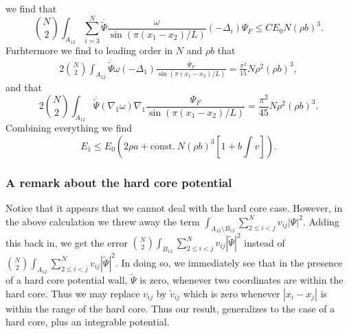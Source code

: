 \documentclass[a4paper,11pt]{article}
\newcommand{\abs}[1]{\left\lvert #1 \right\rvert}
\numberwithin{equation}{section}
\begin{document}
	we find that \begin{equation}
	\binom{N}{2}\int_{A_{12}}\sum_{i=3}^{N} \overline{\tilde{\Psi}}\frac{\omega}{\sin(\pi(x_1-x_2)/L)}(-\Delta_i)\Psi_F\leq C E_0 N(\rho b)^3.
	\end{equation}
	Furhtermore we find to leading order in $ N $ and $ \rho b $ that \begin{equation}
	\begin{aligned}
	2\binom{N}{2}\int_{A_{12}}\overline{\tilde{\Psi}}\omega(-\Delta_1)\frac{\Psi_F}{\sin(\pi(x_1-x_2)/L)}=\frac{\pi^2}{15}N\rho^2 (\rho b)^3,
	\end{aligned}
	\end{equation}
	and that \begin{equation}
	2\binom{N}{2}\int_{A_{12}}\overline{\tilde{\Psi}}(\nabla_1\omega)\nabla_1\frac{\Psi_F}{\sin(\pi(x_1-x_2)/L)}=\frac{\pi^2}{45}N\rho^2(\rho b)^3.
	\end{equation}
	Combining everything we find \begin{equation}
	E_1\leq E_0 \left(2\rho a+ \text{const.}\ N(\rho b)^3\left[ 1+ b\int v\right]\right).
	\end{equation}
	\subsubsection{A remark about the hard core potential}
	Notice that it appears that we cannot deal with the hard core case. However, in the above calculation we threw away the term $ \int_{A_{12}\setminus B_{12}} \sum_{2\leq i<j}^{N}v_{ij}\abs{\Psi}^2 $. Adding this back in, we get the error $ \binom{N}{2}\int_{B_{12}} \sum_{2\leq i<j}^{N}v_{ij}\abs{\tilde{\Psi}}^2 $ instead of $ \binom{N}{2}\int_{A_{12}} \sum_{2\leq i<j}^{N}v_{ij}\abs{\tilde{\Psi}}^2 $. In doing so, we immediately see that in the presence of a hard core potential wall, $ \tilde{\Psi} $ is zero, whenever two coordinates are within the hard core. Thus we may replace $ v_{ij} $ by $ \tilde{v}_{ij} $ which is zero whenever $ \abs{x_i-x_j} $ is within the range of the hard core. Thus our result, generalizes to the case of a hard core, plus an integrable potential.
\end{document}
